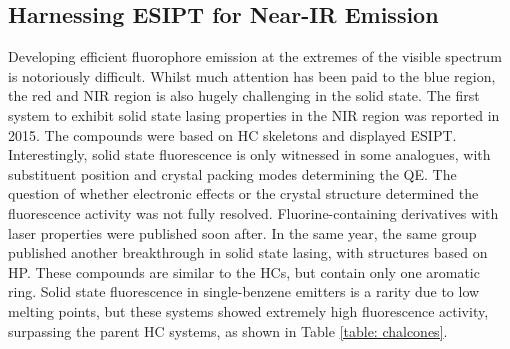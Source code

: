 \subsection{Harnessing ESIPT for Near-IR Emission}
Developing efficient fluorophore emission at the extremes of the visible spectrum is notoriously difficult. Whilst much attention has been paid to the blue region, the red and \ac{NIR} region is also hugely challenging in the solid state. The first system to exhibit solid state lasing properties in the \ac{NIR} region was reported in 2015.\cite{Cheng2015} The compounds were based on \ac{HC} skeletons and displayed \ac{ESIPT}. Interestingly, solid state fluorescence is only witnessed in some analogues, with substituent position and crystal packing modes determining the \ac{QE}. The question of whether electronic effects or the crystal structure determined the fluorescence activity was not fully resolved. Fluorine-containing derivatives with laser properties were published soon after.\cite{Cheng2016} In the same year, the same group published another breakthrough in solid state lasing, with structures based on  \ac{HP}.\cite{Tang2016} These compounds are similar to the \acp{HC}, but contain only one aromatic ring. Solid state fluorescence in single-benzene emitters is a rarity due to low melting points, but these systems showed extremely high fluorescence activity, surpassing the parent \ac{HC} systems, as shown in Table \ref{table: chalcones}.

